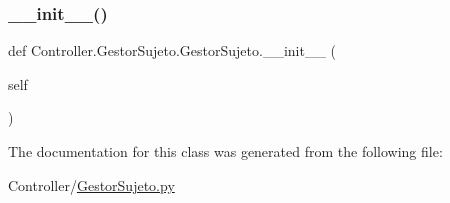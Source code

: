 \subsubsection{\texorpdfstring{\+\_\+\+\_\+init\+\_\+\+\_\+()}{\_\_init\_\_()}}
{\footnotesize\ttfamily def Controller.\+Gestor\+Sujeto.\+Gestor\+Sujeto.\+\_\+\+\_\+init\+\_\+\+\_\+ (\begin{DoxyParamCaption}\item[{}]{self }\end{DoxyParamCaption})}



The documentation for this class was generated from the following file\+:\begin{DoxyCompactItemize}
\item 
Controller/\hyperlink{_gestor_sujeto_8py}{Gestor\+Sujeto.\+py}\end{DoxyCompactItemize}
